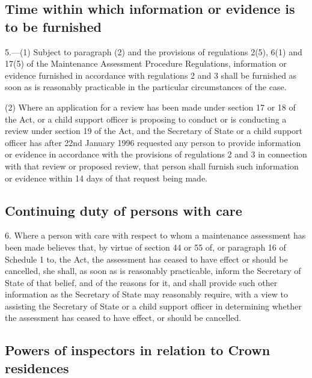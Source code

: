 \documentclass[a4paper,12pt]{article}
\begin{document}
\subsection[5. Time within which information or evidence is to be furnished]{Time within which information or evidence is to be furnished}

5.—(1) Subject to paragraph (2) and the provisions of regulations 2(5), 6(1) and 17(5) of the Maintenance Assessment Procedure Regulations, information or evidence furnished in accordance with regulations 2 and 3 shall be furnished as soon as is reasonably practicable in the particular circumstances of the case.

(2) Where an application for a review has been made under section 17 or 18 of the Act, or a child support officer is proposing to conduct or is conducting a review under section 19 of the Act, and the Secretary of State or a child support officer has after 22nd January 1996 requested any person to provide information or evidence in accordance with the provisions of regulations 2 and 3 in connection with that review or proposed review, that person shall furnish such information or evidence within 14 days of that request being made.


\subsection[6. Continuing duty of persons with care]{Continuing duty of persons with care}

6.  Where a person with care with respect to whom a maintenance assessment has been made believes that, by virtue of section 44 or 55 of, or paragraph 16 of Schedule 1 to, the Act, the assessment has ceased to have effect or should be cancelled, she shall, as soon as is reasonably practicable, inform the Secretary of State of that belief, and of the reasons for it, and shall provide such other information as the Secretary of State may reasonably require, with a view to assisting the Secretary of State or a child support officer in determining whether the assessment has ceased to have effect, or should be cancelled.

\subsection[7. Powers of inspectors in relation to Crown residences]{Powers of inspectors in relation to Crown residences}
\end{document}
